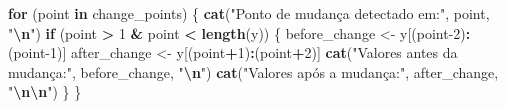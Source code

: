 \documentclass[
]{article}
\newenvironment{Shaded}{\begin{snugshade}}{\end{snugshade}}
\newcommand{\ControlFlowTok}[1]{\textcolor[rgb]{0.13,0.29,0.53}{\textbf{#1}}}
\newcommand{\DecValTok}[1]{\textcolor[rgb]{0.00,0.00,0.81}{#1}}
\newcommand{\FunctionTok}[1]{\textcolor[rgb]{0.13,0.29,0.53}{\textbf{#1}}}
\newcommand{\NormalTok}[1]{#1}
\newcommand{\OtherTok}[1]{\textcolor[rgb]{0.56,0.35,0.01}{#1}}
\newcommand{\SpecialCharTok}[1]{\textcolor[rgb]{0.81,0.36,0.00}{\textbf{#1}}}
\newcommand{\StringTok}[1]{\textcolor[rgb]{0.31,0.60,0.02}{#1}}
\begin{document}
\begin{Shaded}
\begin{Highlighting}[]
\ControlFlowTok{for}\NormalTok{ (point }\ControlFlowTok{in}\NormalTok{ change\_points) \{}
  \FunctionTok{cat}\NormalTok{(}\StringTok{"Ponto de mudança detectado em:"}\NormalTok{, point, }\StringTok{"}\SpecialCharTok{\textbackslash{}n}\StringTok{"}\NormalTok{)}
  \ControlFlowTok{if}\NormalTok{ (point }\SpecialCharTok{\textgreater{}} \DecValTok{1} \SpecialCharTok{\&}\NormalTok{ point }\SpecialCharTok{\textless{}} \FunctionTok{length}\NormalTok{(y)) \{}
\NormalTok{    before\_change }\OtherTok{\textless{}{-}}\NormalTok{ y[(point}\DecValTok{{-}2}\NormalTok{)}\SpecialCharTok{:}\NormalTok{(point}\DecValTok{{-}1}\NormalTok{)]}
\NormalTok{    after\_change }\OtherTok{\textless{}{-}}\NormalTok{ y[(point}\SpecialCharTok{+}\DecValTok{1}\NormalTok{)}\SpecialCharTok{:}\NormalTok{(point}\SpecialCharTok{+}\DecValTok{2}\NormalTok{)]}
    \FunctionTok{cat}\NormalTok{(}\StringTok{"Valores antes da mudança:"}\NormalTok{, before\_change, }\StringTok{"}\SpecialCharTok{\textbackslash{}n}\StringTok{"}\NormalTok{)}
    \FunctionTok{cat}\NormalTok{(}\StringTok{"Valores após a mudança:"}\NormalTok{, after\_change, }\StringTok{"}\SpecialCharTok{\textbackslash{}n\textbackslash{}n}\StringTok{"}\NormalTok{)}
\NormalTok{  \}}
\NormalTok{\}}
\end{Highlighting}
\end{Shaded}
\end{document}
